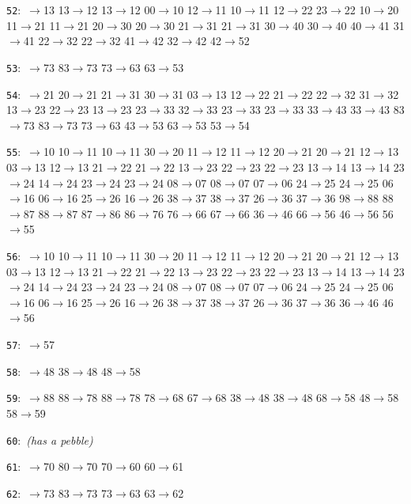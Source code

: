 \documentclass[11pt]{amsart}
\begin{document}
\begin{flushleft}
\noindent\texttt{52}:\ {\footnotesize{}$\to$13 13$\to$12 13$\to$12 00$\to$10 12$\to$11 10$\to$11 12$\to$22 23$\to$22 10$\to$20 11$\to$21 11$\to$21 20$\to$30 20$\to$30 21$\to$31 21$\to$31 30$\to$40 30$\to$40 40$\to$41 31$\to$41 22$\to$32 22$\to$32 41$\to$42 32$\to$42 42$\to$52}\par
\noindent\texttt{53}:\ {\footnotesize{}$\to$73 83$\to$73 73$\to$63 63$\to$53}\par
\noindent\texttt{54}:\ {\footnotesize{}$\to$21 20$\to$21 21$\to$31 30$\to$31 03$\to$13 12$\to$22 21$\to$22 22$\to$32 31$\to$32 13$\to$23 22$\to$23 13$\to$23 23$\to$33 32$\to$33 23$\to$33 23$\to$33 33$\to$43 33$\to$43 83$\to$73 83$\to$73 73$\to$63 43$\to$53 63$\to$53 53$\to$54}\par
\noindent\texttt{55}:\ {\footnotesize{}$\to$10 10$\to$11 10$\to$11 30$\to$20 11$\to$12 11$\to$12 20$\to$21 20$\to$21 12$\to$13 03$\to$13 12$\to$13 21$\to$22 21$\to$22 13$\to$23 22$\to$23 22$\to$23 13$\to$14 13$\to$14 23$\to$24 14$\to$24 23$\to$24 23$\to$24 08$\to$07 08$\to$07 07$\to$06 24$\to$25 24$\to$25 06$\to$16 06$\to$16 25$\to$26 16$\to$26 38$\to$37 38$\to$37 26$\to$36 37$\to$36 98$\to$88 88$\to$87 88$\to$87 87$\to$86 86$\to$76 76$\to$66 67$\to$66 36$\to$46 66$\to$56 46$\to$56 56$\to$55}\par
\noindent\texttt{56}:\ {\footnotesize{}$\to$10 10$\to$11 10$\to$11 30$\to$20 11$\to$12 11$\to$12 20$\to$21 20$\to$21 12$\to$13 03$\to$13 12$\to$13 21$\to$22 21$\to$22 13$\to$23 22$\to$23 22$\to$23 13$\to$14 13$\to$14 23$\to$24 14$\to$24 23$\to$24 23$\to$24 08$\to$07 08$\to$07 07$\to$06 24$\to$25 24$\to$25 06$\to$16 06$\to$16 25$\to$26 16$\to$26 38$\to$37 38$\to$37 26$\to$36 37$\to$36 36$\to$46 46$\to$56}\par
\noindent\texttt{57}:\ {\footnotesize{}$\to$57}\par
\noindent\texttt{58}:\ {\footnotesize{}$\to$48 38$\to$48 48$\to$58}\par
\noindent\texttt{59}:\ {\footnotesize{}$\to$88 88$\to$78 88$\to$78 78$\to$68 67$\to$68 38$\to$48 38$\to$48 68$\to$58 48$\to$58 58$\to$59}\par
\noindent\texttt{60}:\ {\footnotesize\ttfamily \textrm{\itshape (has a pebble)}}\par
\noindent\texttt{61}:\ {\footnotesize{}$\to$70 80$\to$70 70$\to$60 60$\to$61}\par
\noindent\texttt{62}:\ {\footnotesize{}$\to$73 83$\to$73 73$\to$63 63$\to$62}\par

\end{flushleft}
\end{document}
